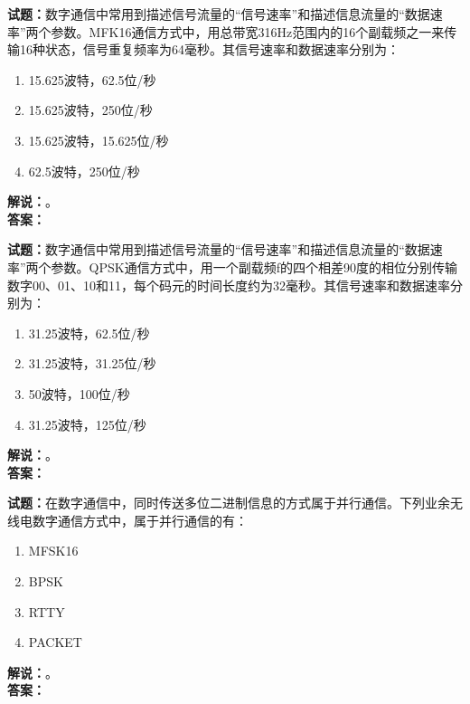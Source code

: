 \documentclass{ctexbook}
\begin{document}
\vspace{\baselineskip}

\noindent\textbf{试题：}数字通信中常用到描述信号流量的“信号速率”和描述信息流量的“数据速率”两个参数。MFK16通信方式中，用总带宽316Hz范围内的16个副载频之一来传输16种状态，信号重复频率为64毫秒。其信号速率和数据速率分别为：
\begin{enumerate}[leftmargin=3em]
  \item 15.625波特，62.5位/秒
  \item 15.625波特，250位/秒
  \item 15.625波特，15.625位/秒
  \item 62.5波特，250位/秒
\end{enumerate}
\noindent\textbf{解说：}\textbf{}。\\\noindent\textbf{答案：}

\vspace{\baselineskip}

\noindent\textbf{试题：}数字通信中常用到描述信号流量的“信号速率”和描述信息流量的“数据速率”两个参数。QPSK通信方式中，用一个副载频f的四个相差90度的相位分别传输数字00、01、10和11，每个码元的时间长度约为32毫秒。其信号速率和数据速率分别为：
\begin{enumerate}[leftmargin=3em]
  \item 31.25波特，62.5位/秒
  \item 31.25波特，31.25位/秒
  \item 50波特，100位/秒
  \item 31.25波特，125位/秒
\end{enumerate}
\noindent\textbf{解说：}\textbf{}。\\\noindent\textbf{答案：}

\vspace{\baselineskip}

\noindent\textbf{试题：}在数字通信中，同时传送多位二进制信息的方式属于并行通信。下列业余无线电数字通信方式中，属于并行通信的有：
\begin{enumerate}[leftmargin=3em]
  \item MFSK16
  \item BPSK
  \item RTTY
  \item PACKET
\end{enumerate}
\noindent\textbf{解说：}\textbf{}。\\\noindent\textbf{答案：}

\vspace{\baselineskip}
\end{document}
